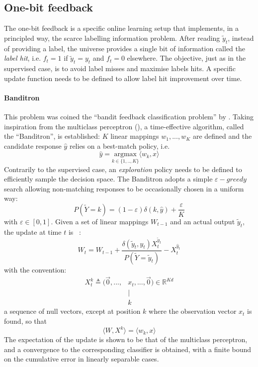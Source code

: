\documentclass[preprint,12pt,authoryear]{elsarticle}
\begin{document}
\subsection{One-bit feedback}
The one-bit feedback is a specific online learning setup that implements, in a principled way, the scarce labelling information problem. After reading $\tilde{y}_t$, instead of providing a label, the universe provides a single bit of information called the \textit{label hit}, i.e. $f_t = 1$ if  $\tilde{y}_t=y_t$ and $f_t = 0$ elsewhere. The objective, just as in the supervised case, is to avoid label misses and maximise labels hits. A specific update function needs to be defined to allow label hit improvement over time. 

\paragraph{Banditron} This problem was coined the ``bandit feedback classification problem'' by \cite{kakade2008efficient}. Taking inspiration from the multiclass perceptron (\cite{duda1973pattern}), a time-effective algorithm, called the ``Banditron'', is established:
$K$ linear mappings $w_1, ..., w_K$ are defined and the candidate response  $\hat{y}$ relies on a best-match policy, i.e.
\begin{equation}\label{eq:argmax}
\hat{y} = \underset{k \in\{1,..,K\}}{\text{argmax}}  \langle w_k, x \rangle
\end{equation}
Contrarily to the supervised case, an \textit{exploration} policy needs to be defined to efficiently sample the decision space. The Banditron adopts a simple  $\varepsilon-greedy$ search allowing  non-matching responses to be occasionally chosen in a uniform way:
\begin{equation}\label{eq:eps-greedy}
P(\tilde{Y}=k) = (1-\varepsilon) \delta(k,\hat{y}) + \frac{\varepsilon}{K}
\end{equation}
 with $\varepsilon \in [0,1]$.
Given a set of linear mappings $W_{t-1}$ %
and an actual output $\tilde{y}_t$, the update at time $t$ is ~:
\begin{equation} \label{eq:banditron-update}
W_t = W_{t-1} + \frac{\delta(\tilde{y}_t ,y_t) X_t^{\tilde{y}_t}}{P(\tilde{Y}=\tilde{y}_t)} - X_t^{\hat{y}_t}
\end{equation}   
with the convention:
\begin{align}\label{eq:X}
X_t^k \triangleq (\vec{0}, ..., & x_t, ..., \vec{0}) \in \mathbb{R}^{K d}\\
&\mid\nonumber\\
&k\nonumber
\end{align}
 a sequence of null vectors, except at position $k$ where the observation vector $x_t$ is found, so that 
 \begin{equation}\label{eq:simil-dot-product}
 \langle W, X^k\rangle = \langle w_k, x\rangle
 \end{equation}
The expectation of the update is shown to be that of the multiclass perceptron, and a convergence to the corresponding  classifier is obtained, with a finite bound on the cumulative error in linearly separable cases. 
\end{document}
